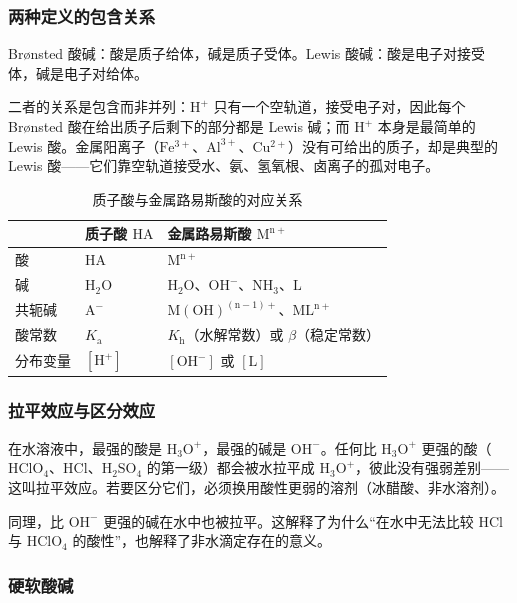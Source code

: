 \documentclass[UTF8]{ctexbook}
\begin{document}
\subsubsection{两种定义的包含关系}

Br\o nsted 酸碱：酸是质子给体，碱是质子受体。Lewis 酸碱：酸是电子对接受体，碱是电子对给体。

二者的关系是包含而非并列：$\mathrm{H^+}$ 只有一个空轨道，接受电子对，因此每个 Br\o nsted 酸在给出质子后剩下的部分都是 Lewis 碱；而 $\mathrm{H^+}$ 本身是最简单的 Lewis 酸。金属阳离子（$\mathrm{Fe^{3+}}$、$\mathrm{Al^{3+}}$、$\mathrm{Cu^{2+}}$）没有可给出的质子，却是典型的 Lewis 酸——它们靠空轨道接受水、氨、氢氧根、卤离子的孤对电子。

\begin{table}[H]
\centering
\caption{质子酸与金属路易斯酸的对应关系}
\begin{tabular}{p{3.2cm}p{5.4cm}p{5.0cm}}
\toprule
 & 质子酸 $\mathrm{HA}$ & 金属路易斯酸 $\mathrm{M^{n+}}$ \\
\midrule
酸 & $\mathrm{HA}$ & $\mathrm{M^{n+}}$ \\
碱 & $\mathrm{H_2O}$ & $\mathrm{H_2O}$、$\mathrm{OH^-}$、$\mathrm{NH_3}$、$\mathrm{L}$ \\
共轭碱 & $\mathrm{A^-}$ & $\mathrm{M(OH)^{(n-1)+}}$、$\mathrm{ML^{n+}}$ \\
酸常数 & $K_{\mathrm{a}}$ & $K_{\mathrm{h}}$（水解常数）或 $\beta$（稳定常数） \\
分布变量 & $[\mathrm{H^+}]$ & $[\mathrm{OH^-}]$ 或 $[\mathrm{L}]$ \\
\bottomrule
\end{tabular}
\end{table}

\subsubsection{拉平效应与区分效应}

在水溶液中，最强的酸是 $\mathrm{H_3O^+}$，最强的碱是 $\mathrm{OH^-}$。任何比 $\mathrm{H_3O^+}$ 更强的酸（$\mathrm{HClO_4}$、$\mathrm{HCl}$、$\mathrm{H_2SO_4}$ 的第一级）都会被水拉平成 $\mathrm{H_3O^+}$，彼此没有强弱差别——这叫拉平效应。若要区分它们，必须换用酸性更弱的溶剂（冰醋酸、非水溶剂）。

同理，比 $\mathrm{OH^-}$ 更强的碱在水中也被拉平。这解释了为什么“在水中无法比较 $\mathrm{HCl}$ 与 $\mathrm{HClO_4}$ 的酸性”，也解释了非水滴定存在的意义。

\subsubsection{硬软酸碱}
\end{document}
